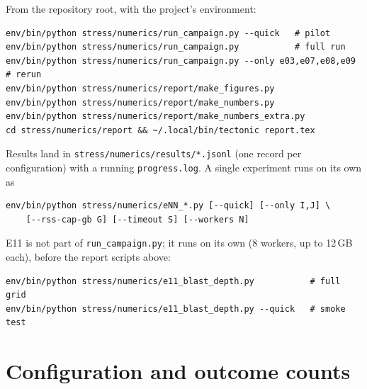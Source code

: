 \documentclass[11pt,a4paper]{article}
\newcommand{\code}[1]{\texttt{#1}}
\begin{document}
From the repository root, with the project's environment:
\begin{verbatim}
env/bin/python stress/numerics/run_campaign.py --quick   # pilot
env/bin/python stress/numerics/run_campaign.py           # full run
env/bin/python stress/numerics/run_campaign.py --only e03,e07,e08,e09  # rerun
env/bin/python stress/numerics/report/make_figures.py
env/bin/python stress/numerics/report/make_numbers.py
env/bin/python stress/numerics/report/make_numbers_extra.py
cd stress/numerics/report && ~/.local/bin/tectonic report.tex
\end{verbatim}
Results land in \code{stress/numerics/results/*.jsonl} (one record per
configuration) with a running \code{progress.log}. A single experiment runs
on its own as
\begin{verbatim}
env/bin/python stress/numerics/eNN_*.py [--quick] [--only I,J] \
    [--rss-cap-gb G] [--timeout S] [--workers N]
\end{verbatim}
E11 is not part of \code{run\_campaign.py}; it runs on its own (8 workers,
up to 12\,GB each), before the report scripts above:
\begin{verbatim}
env/bin/python stress/numerics/e11_blast_depth.py           # full grid
env/bin/python stress/numerics/e11_blast_depth.py --quick   # smoke test
\end{verbatim}


\section{Configuration and outcome counts}
\label{app:counts}

\begin{table}[H]
\centering\footnotesize
\caption{Records and outcomes per experiment, with each experiment's
default per-configuration timeout and RSS cap (some E7 configs override the
timeout). ``run'' says whether the records are the first campaign's or the
rerun's. ``of which budget'' counts the \code{exception} records that are the
library's \code{PointBudgetExceeded}. ``assert'' counts
\code{invariant\_assert} outcomes of the numerics; the topology assertions of
E7 and E11 are genuine errors recorded inside \code{ok} records (E11's are
in \cref{tab:e11errors}).}
\label{tab:counts}
\end{table}
\end{document}

